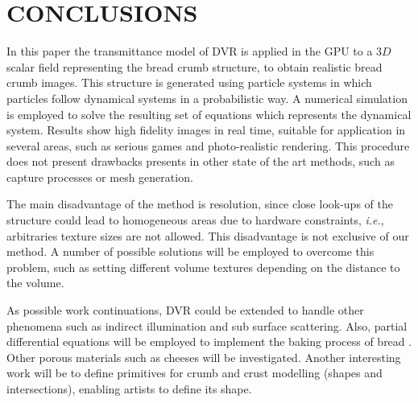 \documentclass[oneside,a4paper,english,links]{amca}
\begin{document}



\section{CONCLUSIONS}

In this paper the transmittance model of DVR is applied in the GPU to a $3D$ scalar field representing the bread crumb structure, to obtain realistic bread crumb images. This structure is generated using particle systems in which particles follow dynamical systems in a probabilistic way. A numerical simulation is employed to solve the resulting set of equations which represents the dynamical system. Results show high fidelity images in real time, suitable for application in several areas, such as serious games \citep{Susi2007} and photo-realistic rendering. This procedure does not present drawbacks presents in other state of the art methods, such as capture processes or mesh generation.

The main disadvantage of the method is resolution, since close look-ups of the structure could lead to homogeneous areas due to hardware constraints, {\em i.e.}, arbitraries texture sizes are not allowed. This disadvantage is not exclusive of our method. A number of possible solutions will be employed to overcome this problem, such as setting different volume textures depending on the distance to the volume. 

As possible work continuations, DVR could be extended to handle other phenomena such as indirect illumination and sub surface scattering. Also, partial differential equations will be employed to implement the baking process of bread \citep{Purlis2012}. Other porous materials such as cheeses will be investigated. Another interesting work will be to define primitives for crumb and crust modelling (shapes and intersections), enabling artists to define its shape.

%

\end{document}
